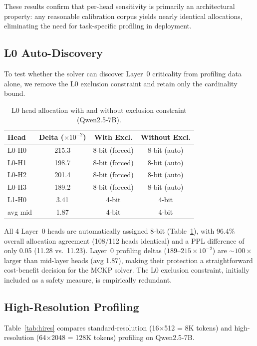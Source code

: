 \documentclass[11pt,a4paper]{article}
\begin{document}
These results confirm that per-head sensitivity is primarily an architectural property: any reasonable calibration corpus yields nearly identical allocations, eliminating the need for task-specific profiling in deployment.

\subsection{L0 Auto-Discovery}

To test whether the solver can discover Layer~0 criticality from profiling data alone, we remove the L0 exclusion constraint and retain only the cardinality bound.

\begin{table}[t]
\centering
\small
\caption{L0 head allocation with and without exclusion constraint (Qwen2.5-7B).}
\label{tab:l0auto}
\begin{tabular}{lccc}
\toprule
\textbf{Head} & \textbf{Delta ($\times 10^{-2}$)} & \textbf{With Excl.} & \textbf{Without Excl.} \\
\midrule
L0-H0 & 215.3 & 8-bit (forced) & 8-bit (auto) \\
L0-H1 & 198.7 & 8-bit (forced) & 8-bit (auto) \\
L0-H2 & 201.4 & 8-bit (forced) & 8-bit (auto) \\
L0-H3 & 189.2 & 8-bit (forced) & 8-bit (auto) \\
L1-H0 & 3.41 & 4-bit & 4-bit \\
avg mid & 1.87 & 4-bit & 4-bit \\
\bottomrule
\end{tabular}
\end{table}

All 4 Layer~0 heads are automatically assigned 8-bit (Table~\ref{tab:l0auto}), with 96.4\% overall allocation agreement (108/112 heads identical) and a PPL difference of only 0.05 (11.28 vs.\ 11.23).
Layer~0 profiling deltas ($189$--$215 \times 10^{-2}$) are $\sim$$100\times$ larger than mid-layer heads (avg 1.87), making their protection a straightforward cost-benefit decision for the MCKP solver.
The L0 exclusion constraint, initially included as a safety measure, is empirically redundant.

\subsection{High-Resolution Profiling}

Table~\ref{tab:hires} compares standard-resolution (16$\times$512 = 8K tokens) and high-resolution (64$\times$2048 = 128K tokens) profiling on Qwen2.5-7B.
\end{document}
